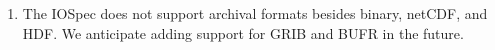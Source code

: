 

\begin{enumerate}

\item The IOSpec does not support archival formats besides
binary, netCDF, and HDF.  We anticipate adding support for GRIB 
and BUFR in the future.

\end{enumerate}



